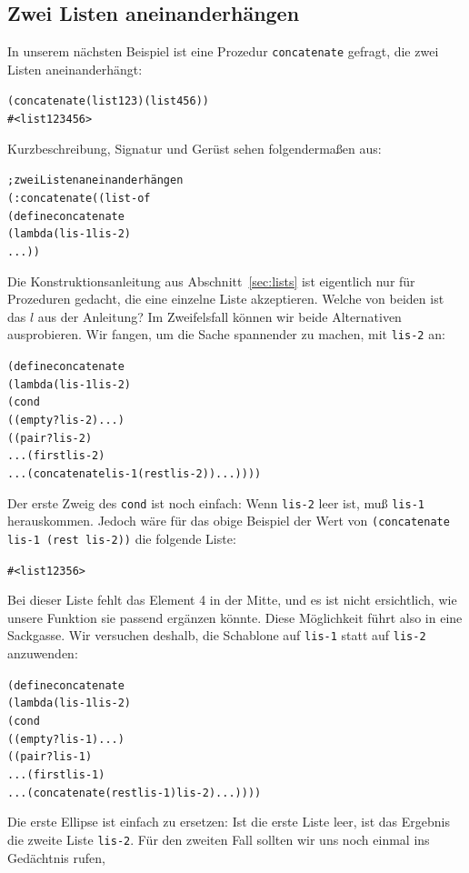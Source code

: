 \subsection{Zwei Listen aneinanderhängen}
In unserem nächsten Beispiel ist eine Prozedur
\texttt{concatenate} gefragt, die zwei
Listen aneinanderhängt:\label{sec:concatenate}
% 
\begin{alltt}
(concatenate (list 1 2 3) (list 4 5 6))
\evalsto{} #<list 1 2 3 4 5 6>
\end{alltt}
%
Kurzbeschreibung, Signatur und Gerüst sehen folgendermaßen aus:
%
\begin{alltt}
; zwei Listen aneinanderhängen
(: concatenate ((list-of %
(define concatenate
  (lambda (lis-1 lis-2)
    ...))
\end{alltt}
%
Die Konstruktionsanleitung aus Abschnitt~\ref{sec:lists} ist
eigentlich nur für Prozeduren gedacht, die eine einzelne Liste
akzeptieren.  Welche von beiden ist das $l$ aus der Anleitung?  Im
Zweifelsfall können wir beide Alternativen ausprobieren.  Wir
fangen, um die Sache spannender zu machen, mit \texttt{lis-2} an:
%
\begin{alltt}
(define concatenate
  (lambda (lis-1 lis-2)
    (cond
      ((empty? lis-2) ...)
      ((pair? lis-2) 
       ... (first lis-2)
       ... (concatenate lis-1 (rest lis-2)) ...))))
\end{alltt}
%
Der erste Zweig des \texttt{cond} ist noch einfach: Wenn
\texttt{lis-2} leer ist, muß \texttt{lis-1} herauskommen.  Jedoch wäre für
das obige Beispiel der Wert von \texttt{(concatenate lis-1 (rest lis-2))} die
folgende Liste:
%
\begin{alltt}
#<list 1 2 3 5 6>
\end{alltt}
%
Bei dieser Liste fehlt das
Element 4 in der Mitte, und es ist nicht ersichtlich, wie unsere Funktion
sie passend ergänzen könnte.  Diese
Möglichkeit führt also in eine Sackgasse. Wir versuchen deshalb, die Schablone  auf
\texttt{lis-1} 
 statt auf \texttt{lis-2} anzuwenden:
%
\begin{alltt}
(define concatenate
  (lambda (lis-1 lis-2)
    (cond
      ((empty? lis-1) ...)
      ((pair? lis-1) 
       ... (first lis-1)
       ... (concatenate (rest lis-1) lis-2) ...))))
\end{alltt}
%
Die erste Ellipse ist einfach zu ersetzen:  Ist die erste Liste
leer, ist das Ergebnis die zweite Liste \texttt{lis-2}.  Für den
zweiten Fall sollten wir uns noch einmal ins Gedächtnis rufen,
